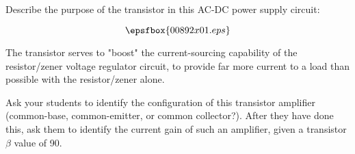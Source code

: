 

Describe the purpose of the transistor in this AC-DC power supply circuit:

$$\epsfbox{00892x01.eps}$$







The transistor serves to "boost" the current-sourcing capability of the resistor/zener voltage regulator circuit, to provide far more current to a load than possible with the resistor/zener alone.







Ask your students to identify the configuration of this transistor amplifier (common-base, common-emitter, or common collector?).  After they have done this, ask them to identify the current gain of such an amplifier, given a transistor $\beta$ value of 90.




